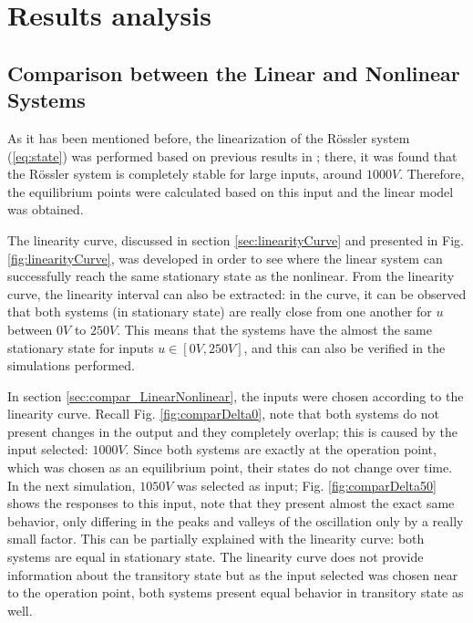 \section{Results analysis}\label{sec:resultAn}
\subsection{Comparison between the Linear and Nonlinear Systems}
As it has been mentioned before, the linearization of the Rössler system (\ref{eq:state}) was performed based on previous results in \cite{JS_PL}; there, it was found that the Rössler system is completely stable for large inputs, around $1000V$. Therefore, the equilibrium points were calculated based on this input and the linear model was obtained.

The linearity curve, discussed in section \ref{sec:linearityCurve} and presented in Fig. \ref{fig:linearityCurve}, was developed in order to see where the linear system can successfully reach the same stationary state as the nonlinear. From the linearity curve, the linearity interval can also be extracted: in the curve, it can be observed that both systems (in stationary state) are really close from one another for $u$ between $0V$ to $250V$. This means that the systems have the almost the same stationary state for inputs $u\in[0V,250V]$, and this can also be verified in the simulations performed.

In section \ref{sec:compar_LinearNonlinear}, the inputs were chosen according to the linearity curve. Recall Fig. \ref{fig:comparDelta0}, note that both systems do not present changes in the output and they completely overlap; this is caused by the input selected: $1000V$. Since both systems are exactly at the operation point, which was chosen as an equilibrium point, their states do not change over time. In the next simulation, $1050V$ was selected as input; Fig. \ref{fig:comparDelta50} shows the responses to this input, note that they present almost the exact same behavior, only differing in the peaks and valleys of the oscillation only by a really small factor. This can be partially explained with the linearity curve: both systems are equal in stationary state. The linearity curve does not provide information about the transitory state but as the input selected was chosen near to the operation point, both systems present equal behavior in transitory state as well.

